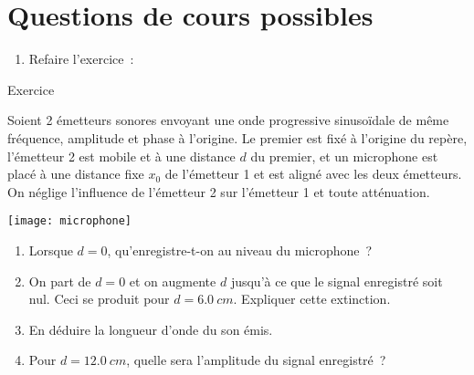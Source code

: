 \documentclass[a4paper, 10pt, final, garamond]{book}
\begin{document}
\section{Questions de cours possibles}
\begin{enumerate}
    \item Refaire l'exercice~:
\end{enumerate}
\begin{NCexem}[breakable]{Exercice}
    \begin{minipage}{0.55\linewidth}
        Soient 2 émetteurs sonores envoyant une onde progressive sinusoïdale de
        même fréquence, amplitude et phase à l'origine. Le premier est fixé à
        l'origine du repère, l'émetteur 2 est mobile et à une distance $d$ du
        premier, et un microphone est placé à une distance fixe $x_0$ de
        l'émetteur 1 et est aligné avec les deux émetteurs. On néglige
        l'influence de l'émetteur 2 sur l'émetteur 1 et toute atténuation.
    \end{minipage}
    \hfill
    \begin{minipage}{0.45\linewidth}
        \begin{center}
            \texttt{[image: microphone]}
        \end{center}
    \end{minipage}
    \begin{enumerate}[label=\sqenumi]
        \item Lorsque $d=0$, qu'enregistre-t-on au niveau du microphone~?
        \item On part de $d=0$ et on augmente $d$ jusqu'à ce que le signal
            enregistré soit nul. Ceci se produit pour $d = \SI{6.0}{cm}$.
            Expliquer cette extinction.
        \item En déduire la longueur d'onde du son émis.
        \item Pour $d = \SI{12.0}{cm}$, quelle sera l'amplitude du signal
            enregistré~?
    \end{enumerate}
\end{NCexem}
\end{document}
